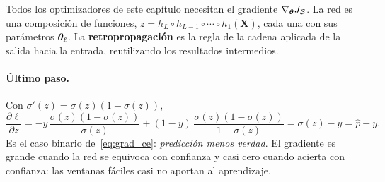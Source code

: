 Todos los optimizadores de este capítulo necesitan el gradiente $\nabla_{\boldsymbol{\theta}}J_{\mathcal{B}}$. La red es una composición
de funciones, $z = h_L \circ h_{L-1} \circ \cdots \circ h_1(\mathbf{X})$, cada una con sus parámetros $\boldsymbol{\theta}_\ell$. La
\textbf{retropropagación} es la regla de la cadena aplicada de la salida hacia la entrada, reutilizando los resultados
intermedios.

\paragraph{Último paso.} Con $\sigma'(z) = \sigma(z)(1 - \sigma(z))$,
\begin{equation}
  \frac{\partial\ell}{\partial z} = -y\,\frac{\sigma(z)(1 - \sigma(z))}{\sigma(z)} + (1 - y)\,\frac{\sigma(z)(1 - \sigma(z))}{1 - \sigma(z)}
  = \sigma(z) - y = \hat p - y.
  \label{eq:grad_bce}
\end{equation}
Es el caso binario de~\eqref{eq:grad_ce}: \emph{predicción menos verdad}. El gradiente es grande cuando la red se equivoca
con confianza y casi cero cuando acierta con confianza: las ventanas fáciles casi no aportan al aprendizaje.

